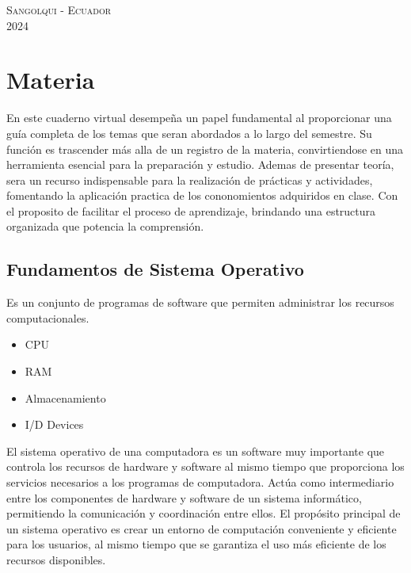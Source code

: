 \documentclass[11pt,twoside]{book}
\begin{document}
\begin{center} \Large \textsc{Sangolqui - Ecuador} \\
\vspace{0.5cm}
  \Large \textsc{2024 } \end{center}

\let\cleardoublepage\clearpage

\begin{center}
  \tableofcontents
  \label{toc-contents}
\end{center}
\clearpage %

\setcounter{chapter}{0}
\renewcommand{\thechapter}{\arabic{chapter}}

\adjustmtc
\setcounter{mtc}{0}
\clearpage
\chapter{Materia}
En este cuaderno virtual desempeña un papel fundamental al proporcionar una guía completa de los temas que seran abordados a lo largo del semestre. Su función es trascender más alla de un registro de la materia, convirtiendose en una herramienta esencial para la preparación y estudio. Ademas de presentar teoría, sera un recurso indispensable para la realización de prácticas y actividades, fomentando la aplicación practica de los cononomientos adquiridos en clase. Con el proposito de facilitar el proceso de aprendizaje, brindando una estructura organizada que potencia la comprensión.
\section{Fundamentos de Sistema Operativo}

Es un conjunto de programas de software que permiten administrar los recursos computacionales.
\begin{itemize}
  \item CPU
  \item RAM
  \item Almacenamiento
  \item I/D Devices
  \end{itemize}
El sistema operativo de una computadora es un software muy importante que controla los recursos de hardware y software al mismo tiempo que proporciona los servicios necesarios a los programas de computadora. Actúa como intermediario entre los componentes de hardware y software de un sistema informático, permitiendo la comunicación y coordinación entre ellos. El propósito principal de un sistema operativo es crear un entorno de computación conveniente y eficiente para los usuarios, al mismo tiempo que se garantiza el uso más eficiente de los recursos disponibles.  
\end{document}
